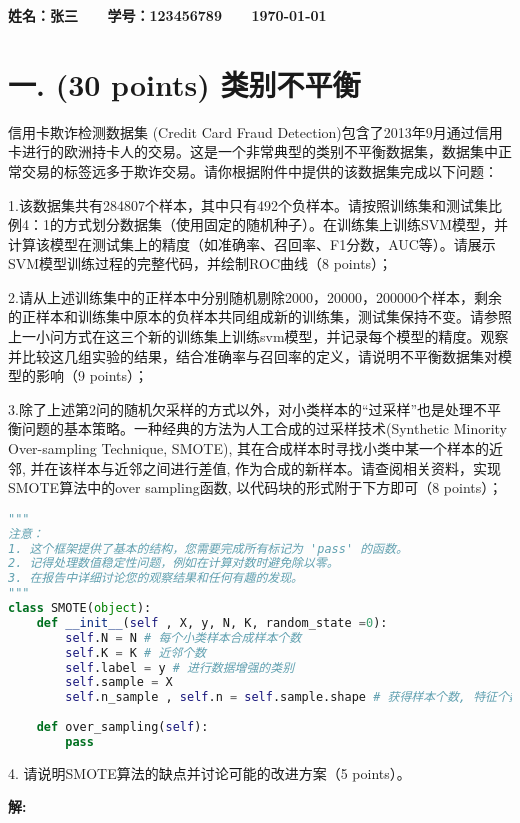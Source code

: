 \documentclass[8pt]{article}
\begin{document}
\textbf{\color{blue} \Large 姓名：张三 \ \ \ 学号：123456789 \ \ \ \today}


\section*{一. (30 points) 类别不平衡}

信用卡欺诈检测数据集 (Credit Card Fraud Detection)包含了2013年9月通过信用卡进行的欧洲持卡人的交易。这是一个非常典型的类别不平衡数据集，数据集中正常交易的标签远多于欺诈交易。请你根据附件中提供的该数据集完成以下问题：


1.该数据集共有284807个样本，其中只有492个负样本。请按照训练集和测试集比例4：1的方式划分数据集（使用固定的随机种子）。在训练集上训练SVM模型，并计算该模型在测试集上的精度（如准确率、召回率、F1分数，AUC等）。请展示SVM模型训练过程的完整代码，并绘制ROC曲线（8 points）；

2.请从上述训练集中的正样本中分别随机剔除2000，20000，200000个样本，剩余的正样本和训练集中原本的负样本共同组成新的训练集，测试集保持不变。请参照上一小问方式在这三个新的训练集上训练svm模型，并记录每个模型的精度。观察并比较这几组实验的结果，结合准确率与召回率的定义，请说明不平衡数据集对模型的影响（9 points）；

3.除了上述第2问的随机欠采样的方式以外，对小类样本的“过采样”也是处理不平衡问题的基本策略。一种经典的方法为人工合成的过采样技术(Synthetic Minority Over-sampling Technique, SMOTE), 其在合成样本时寻找小类中某一个样本的近邻, 并在该样本与近邻之间进行差值, 作为合成的新样本。请查阅相关资料，实现SMOTE算法中的over sampling函数, 以代码块的形式附于下方即可（8 points）；

\begin{lstlisting}[breaklines=true, language=Python, caption=SMOTE模型接口]
"""
注意：
1. 这个框架提供了基本的结构，您需要完成所有标记为 'pass' 的函数。
2. 记得处理数值稳定性问题，例如在计算对数时避免除以零。
3. 在报告中详细讨论您的观察结果和任何有趣的发现。
"""
class SMOTE(object):
    def __init__(self , X, y, N, K, random_state =0):
        self.N = N # 每个小类样本合成样本个数
        self.K = K # 近邻个数
        self.label = y # 进行数据增强的类别
        self.sample = X
        self.n_sample , self.n = self.sample.shape # 获得样本个数, 特征个数
    
    def over_sampling(self):
        pass
\end{lstlisting}

4. 请说明SMOTE算法的缺点并讨论可能的改进方案（5 points）。

\textbf{\large 解:}
\end{document}
